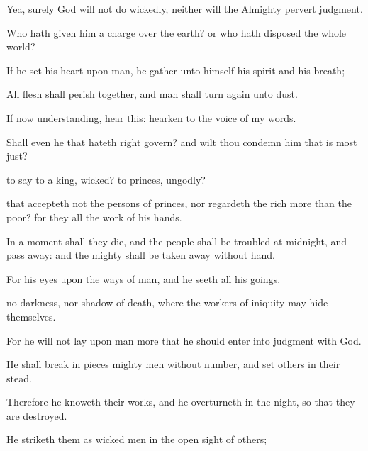 {Yea,
surely
God will not do
wickedly, neither will the
Almighty
pervert
judgment.

Who hath given him a
charge over the
earth? or who hath
disposed the whole
world?

If he
set his
heart upon man,
{} he
gather unto himself his
spirit and his
breath;

All
flesh shall
perish
together, and
man shall turn
again unto
dust.


\par }{\PP {}If now
{}
understanding,
hear this:
hearken to the
voice of my
words.

Shall even he that
hateth
right
govern? and wilt thou
condemn him that is
most
just?

 to
say to a
king,
{}
wicked?
{} to
princes,
{}
ungodly?

 that
accepteth not the
persons of
princes, nor
regardeth the
rich more
than the
poor? for they all
{} the
work of his
hands.

In a
moment shall they
die, and the
people shall be
troubled at
midnight, and pass
away: and the
mighty shall be taken
away without
hand.

For his
eyes
{} upon the
ways of
man, and he
seeth all his
goings.

 no
darkness, nor shadow of
death, where the
workers of
iniquity may
hide themselves.

For he will not
lay upon
man more
{} that he should
enter into
judgment with
God.

He shall break in
pieces mighty
men without
number, and
set
others in their stead.

Therefore he
knoweth their
works, and he
overturneth
{} in the
night, so that they are
destroyed.

He
striketh them
as wicked
men in the
open
sight of others;

}
